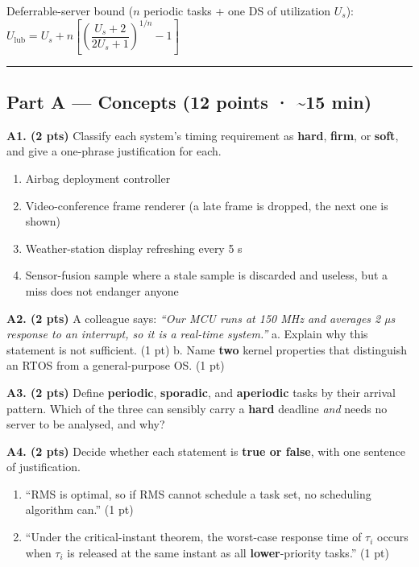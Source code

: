 \documentclass[
  11pt,
]{article}
\providecommand{\tightlist}{%
  \setlength{\itemsep}{0pt}\setlength{\parskip}{0pt}}
\begin{document}
Deferrable-server bound (\(n\) periodic tasks + one DS of utilization
\(U_s\)):
\(U_{\text{lub}} = U_s + n\left[\left(\dfrac{U_s+2}{2U_s+1}\right)^{1/n} - 1\right]\)

\begin{center}\rule{0.5\linewidth}{0.5pt}\end{center}

\subsection{Part A --- Concepts (12 points · \textasciitilde15
min)}\label{part-a-concepts-12-points-15-min}

\textbf{A1. (2 pts)} Classify each system's timing requirement as
\textbf{hard}, \textbf{firm}, or \textbf{soft}, and give a one-phrase
justification for each.

\begin{enumerate}
\def\labelenumi{\alph{enumi}.}
\tightlist
\item
  Airbag deployment controller
\item
  Video-conference frame renderer (a late frame is dropped, the next one
  is shown)
\item
  Weather-station display refreshing every 5 s
\item
  Sensor-fusion sample where a stale sample is discarded and useless,
  but a miss does not endanger anyone
\end{enumerate}

\textbf{A2. (2 pts)} A colleague says: \emph{``Our MCU runs at 150 MHz
and averages 2 µs response to an interrupt, so it is a real-time
system.''} a. Explain why this statement is not sufficient. (1 pt) b.
Name \textbf{two} kernel properties that distinguish an RTOS from a
general-purpose OS. (1 pt)

\textbf{A3. (2 pts)} Define \textbf{periodic}, \textbf{sporadic}, and
\textbf{aperiodic} tasks by their arrival pattern. Which of the three
can sensibly carry a \textbf{hard} deadline \emph{and} needs no server
to be analysed, and why?

\textbf{A4. (2 pts)} Decide whether each statement is \textbf{true or
false}, with one sentence of justification.

\begin{enumerate}
\def\labelenumi{\alph{enumi}.}
\tightlist
\item
  ``RMS is optimal, so if RMS cannot schedule a task set, no scheduling
  algorithm can.'' (1 pt)
\item
  ``Under the critical-instant theorem, the worst-case response time of
  \(\tau_i\) occurs when \(\tau_i\) is released at the same instant as
  all \textbf{lower}-priority tasks.'' (1 pt)
\end{enumerate}
\end{document}
